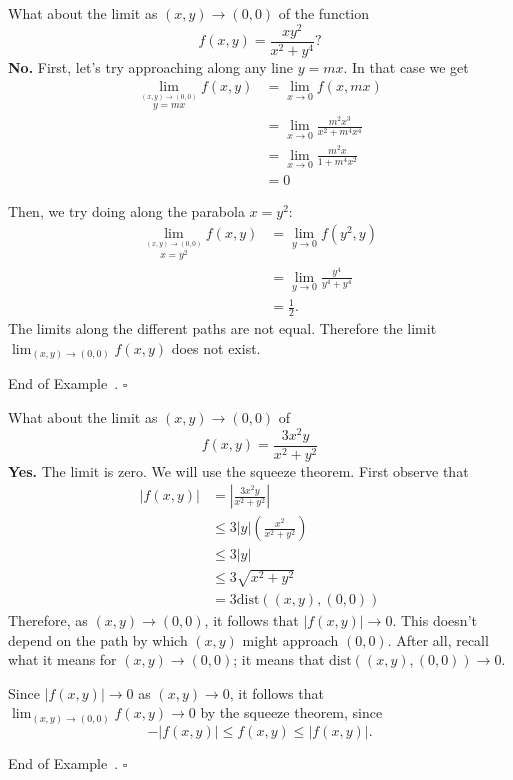 \documentclass[10pt]{article}
\theoremstyle{definition}
\newtheorem{example}[theorem]{Example}
\renewenvironment{example}
{\begin{oldexample}}
  {\par\smallskip\hfill   End of Example~\theexample. $\square$    \par\end{oldexample}}
\newcommand{\vt}{\vskip 5mm} %
\newcommand{\Fl}{\vt\noindent\textbf} %
\newcommand{\1}[1]{\textbf{1}_{\left[#1\right]}} %
\begin{document}
\begin{example}
  What about the limit as $(x,y)\to (0,0)$ of the function
  \begin{equation*}
    f(x,y) = \frac{xy^{2}}{x^{2}+y^{4}}?
  \end{equation*}
  \Fl{No.} First, let's try approaching along any line $y = mx$. In that case
  we get
  \begin{align*}
    \lim_{\overset{(x,y)\to (0,0)}{y=mx}}f(x,y) 
    &= \lim_{x \to 0} f(x,mx) \\
    &= \lim_{x \to 0} \frac{m^{2}x^{3}  }{x^{2}+m^{4}x^{4}} \\
    &= \lim_{x \to 0} \frac{m^{2}x  }{1+m^{4}x^{2}} \\
    &= 0
  \end{align*}

  Then, we try doing along the parabola $x=y^{2}$:
  \begin{align*}
    \lim_{\overset{(x,y)\to (0,0)}{x=y^{2}}}f(x,y)
    &=\lim_{y \to 0}f(y^{2},y)\\
    &=\lim_{y \to 0}\frac{y^{4}}{y^{4}+y^{4}}\\
    &=\frac{1}{2}.
  \end{align*}
  The limits along the different paths are not equal. Therefore the limit
  $\lim_{(x,y)\to (0,0)}f(x,y)$ does not exist.
\end{example}

\begin{example}
  \label{ex:later}
  What about the limit as $(x,y)\to (0,0)$ of
  \begin{equation*}
    f(x,y) = \frac{3x^{2}y}{x^{2}+y^{2}}
  \end{equation*}
  \Fl{Yes.} The limit is zero. We will use the squeeze theorem. First observe that
  \begin{align*}
    |f(x,y)|
    &= \left| \frac{3x^{2}y}{x^{2}+y^{2}} \right|\\
    &\leq  3|y| \left( \frac{x^{2}}{x^{2}+y^{2}} \right)\\ 
    &\leq 3|y|\\
    &\leq 3 \sqrt{x^{2}+y^{2}}\\
    &= 3 \text{dist}((x,y),(0,0))
  \end{align*}
  Therefore, as $(x,y) \to (0,0)$, it follows that $|f(x,y)| \to 0$. This
  doesn't depend on the path by which $(x,y)$ might approach $(0,0)$. After
  all, recall what it means for $(x,y) \to (0,0)$; it means that
  $\text{dist}((x,y),(0,0))\to 0$.

  Since $|f(x,y)| \to 0$ as $(x,y) \to 0$, it follows that $\lim_{(x,y)\to
    (0,0)} f(x,y) \to 0$ by the squeeze theorem, since
  \begin{equation*}
    -|f(x,y)| \leq f(x,y) \leq |f(x,y)|.
  \end{equation*}
\end{example}
\end{document}
